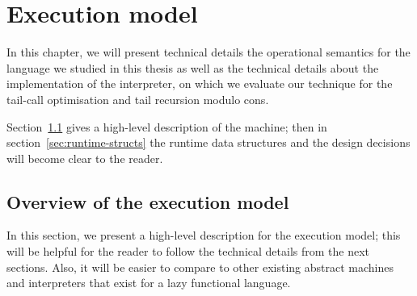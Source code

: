 \documentclass[diploma]{softlab-thesis}
\begin{document}
\chapter {Execution model}
\label{ch:execution-model}

In this chapter, we will present technical details the operational semantics for the 
language we studied in this thesis as well as the technical details about the implementation of
the interpreter, on which we evaluate our technique for the tail-call optimisation and
tail recursion modulo cons.

Section~\ref{sec:execution-model-overview} gives a high-level description of the machine; 
then in section~\ref{sec:runtime-structs} the runtime 
data structures and the design decisions will become clear to the reader.


\section {Overview of the execution model}
\label{sec:execution-model-overview}

In this section, we present a high-level description for the execution model; this will be helpful for the reader
to follow the technical details from the next sections. Also, it will be easier to compare to other existing 
abstract machines and interpreters that exist for a lazy functional language.
\end{document}
